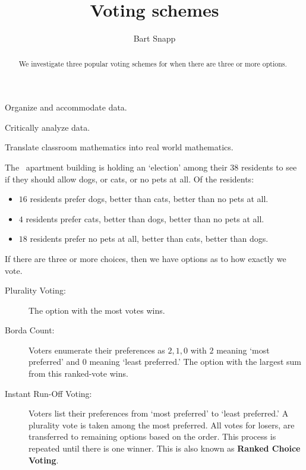 \documentclass[nooutcomes,noauthor,hints,handout]{ximera}
\title{Voting schemes}
\author{Bart Snapp}
\begin{document}
\begin{abstract}
  We investigate three popular voting schemes for when there are three
  or more options.
\end{abstract}
\maketitle

\begin{listOutcomes}
\item Organize and accommodate data.
\item Critically analyze data.
\item Translate classroom mathematics into real world mathematics.
\end{listOutcomes}


The \mooculus~apartment building is holding an `election' among
their $38$ residents to see if they should allow dogs, or cats, or no
pets at all. Of the residents:
\begin{itemize}
\item $16$ residents prefer dogs, better than cats, better than no pets at all.
\item $4$ residents prefer cats, better than dogs, better than no pets at all.
\item $18$ residents prefer no pets at all, better than cats, better
  than dogs.
\end{itemize}



If there are three or more choices, then we have options as to how
exactly we vote. 
\begin{description}
\item[Plurality Voting:] The option with the most
  votes wins.
\item[Borda Count:] Voters enumerate their preferences as $2,1,0$
  with $2$ meaning `most preferred' and $0$ meaning `least preferred.'
  The option with the largest sum from this ranked-vote wins.
\item[Instant Run-Off Voting:] Voters list their preferences from `most
  preferred' to `least preferred.' A plurality vote is taken among the
  most preferred. All votes for losers, are transferred to remaining
  options based on the order. This process is repeated until there is
  one winner. This is also known as \textbf{Ranked Choice Voting}.
\end{description}
\end{document}
